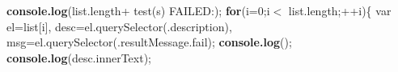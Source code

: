 {\begin{DoxyParamCaption}
                                                                                                                                                                                                                                                                                 {\bf console.\+log}(list.\+length+ \textquotesingle{}test(s) F\+A\+I\+L\+E\+D\+:\textquotesingle{});                                                                                                                                                                                                                                                                                                                   {\bf for}(i=0;i$<$ list.\+length;++i)\{                                                                                                                                                                                                                                                                                                                                                                                   var el=list\mbox{[}i\mbox{]},                                                                                                                                                                                                                                                                                                                                                                                                                                                   desc=el.\+query\+Selector(\textquotesingle{}.description\textquotesingle{}),                                                                                                                                                                                                                                                                                                                                                                                                                                                   msg=el.\+query\+Selector(\textquotesingle{}.result\+Message.\+fail\textquotesingle{});                                                                                                                                                                                                                                                                                                                                                                                   {\bf console.\+log}(\textquotesingle{}\textquotesingle{});                                                                                                                                                                                                                                                                                                                                                                                   {\bf console.\+log}(desc.\+inner\+Text);                                                                                                                                                                                                                                                                                                                               
\end{DoxyParamCaption}}

